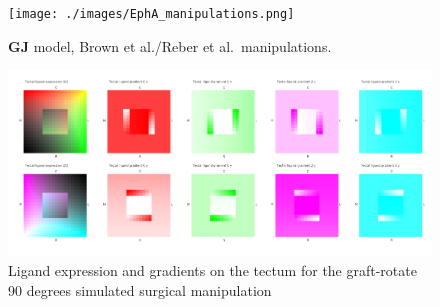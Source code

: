 \documentclass[11pt, a4paper]{article}
\begin{document}
\begin{figure}
\texttt{[image: ./images/EphA\_manipulations.png]}
\caption{$\mathbf{GJ}$ model, Brown et al./Reber et al.~manipulations.}
\label{f:GJeph}
\end{figure}

\renewcommand{\thefigure}{S\arabic{figure}}
\setcounter{figure}{0}

\begin{figure}
\includegraphics[width=\linewidth]{./images/Tissuevisb.png}
\caption{Ligand expression and gradients on the tectum for the
graft-rotate 90 degrees simulated surgical manipulation}
\label{f:trot90}
\end{figure}
\end{document}
